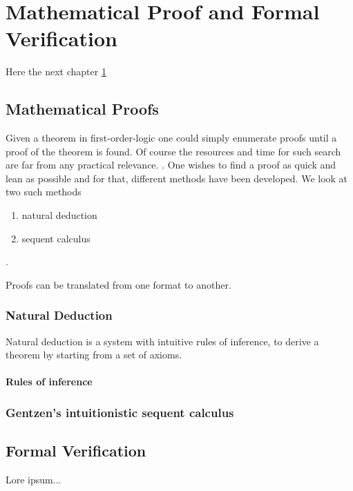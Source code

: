


\chapter{Mathematical Proof and Formal Verification}
\label{c:chapter2}

Here the next chapter \ref{c:chapter2}

\section{Mathematical Proofs}
Given a theorem in first-order-logic one could simply enumerate proofs until a proof of the theorem is found. Of course the resources and time for such search are far from any practical relevance. .
One wishes to find a proof as quick and lean as possible and for that, different methods have been developed. We look at two such methods
\begin{enumerate}
  \item natural deduction
  \item sequent calculus
\end{enumerate}
\cite{truth_through_proof}.

Proofs can be translated from one format to another. 

\subsection{Natural Deduction}
Natural deduction is a system with intuitive rules of inference, to derive a theorem by starting from a set of axioms.

\subsubsection{Rules of inference}


\subsection{Gentzen's intuitionistic sequent calculus}


\section{Formal Verification}
Lore ipsum...

